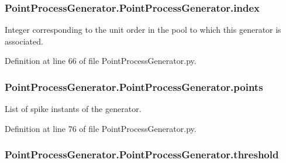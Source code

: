 \subsubsection[{\texorpdfstring{index}{index}}]{\setlength{\rightskip}{0pt plus 5cm}Point\+Process\+Generator.\+Point\+Process\+Generator.\+index}\hypertarget{class_point_process_generator_1_1_point_process_generator_a57f6c8af8fd3d37ed8ab2f4abe9be5d8}{}\label{class_point_process_generator_1_1_point_process_generator_a57f6c8af8fd3d37ed8ab2f4abe9be5d8}


Integer corresponding to the unit order in the pool to which this generator is associated. 



Definition at line 66 of file Point\+Process\+Generator.\+py.

\subsubsection[{\texorpdfstring{points}{points}}]{\setlength{\rightskip}{0pt plus 5cm}Point\+Process\+Generator.\+Point\+Process\+Generator.\+points}\hypertarget{class_point_process_generator_1_1_point_process_generator_ab36d31f34c0330e13ae9732d53984bab}{}\label{class_point_process_generator_1_1_point_process_generator_ab36d31f34c0330e13ae9732d53984bab}


List of spike instants of the generator. 



Definition at line 76 of file Point\+Process\+Generator.\+py.

\subsubsection[{\texorpdfstring{threshold}{threshold}}]{\setlength{\rightskip}{0pt plus 5cm}Point\+Process\+Generator.\+Point\+Process\+Generator.\+threshold}\hypertarget{class_point_process_generator_1_1_point_process_generator_abcb23e09b752b797a1f11f2679373ca1}{}\label{class_point_process_generator_1_1_point_process_generator_abcb23e09b752b797a1f11f2679373ca1}


